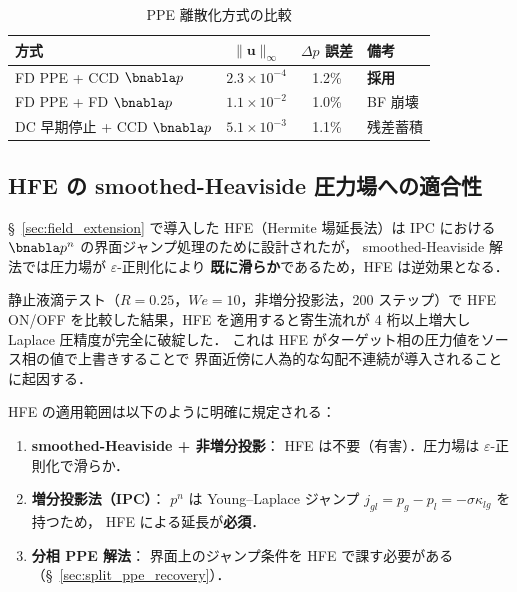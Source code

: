 \begin{table}[htbp]
\centering
\caption{PPE 離散化方式の比較}
\label{tab:ppe_method_comparison}
\begin{tabular}{lccl}
\toprule
方式 & $\|\bm{u}\|_\infty$ & $\Delta p$ 誤差 & 備考 \\
\midrule
FD PPE + CCD $\bnabla p$ & $2.3 \times 10^{-4}$ & 1.2\% & \textbf{採用} \\
FD PPE + FD $\bnabla p$  & $1.1 \times 10^{-2}$ & 1.0\% & BF 崩壊 \\
DC 早期停止 + CCD $\bnabla p$ & $5.1 \times 10^{-3}$ & 1.1\% & 残差蓄積 \\
\bottomrule
\end{tabular}
\end{table}

\subsection{HFE の smoothed-Heaviside 圧力場への適合性}
\label{sec:hfe_smoothed_scope}

§~\ref{sec:field_extension} で導入した HFE（Hermite 場延長法）は
IPC における $\bnabla p^n$ の界面ジャンプ処理のために設計されたが，
smoothed-Heaviside 解法では圧力場が $\varepsilon$-正則化により
\textbf{既に滑らか}であるため，HFE は逆効果となる．

静止液滴テスト（$R=0.25$，$\mathit{We} = 10$，非増分投影法，200 ステップ）で
HFE ON/OFF を比較した結果，HFE を適用すると寄生流れが 4 桁以上増大し
Laplace 圧精度が完全に破綻した．
これは HFE がターゲット相の圧力値をソース相の値で上書きすることで
界面近傍に人為的な勾配不連続が導入されることに起因する．

HFE の適用範囲は以下のように明確に規定される：
\begin{enumerate}[noitemsep]
  \item \textbf{smoothed-Heaviside + 非増分投影}：
        HFE は不要（有害）．圧力場は $\varepsilon$-正則化で滑らか．
  \item \textbf{増分投影法（IPC）}：
        $p^n$ は Young--Laplace ジャンプ $j_{gl}=p_g-p_l=-\sigma\kappa_{lg}$ を持つため，
        HFE による延長が\textbf{必須}．
  \item \textbf{分相 PPE 解法}：
        界面上のジャンプ条件を HFE で課す必要がある
        （§~\ref{sec:split_ppe_recovery}）．
\end{enumerate}

